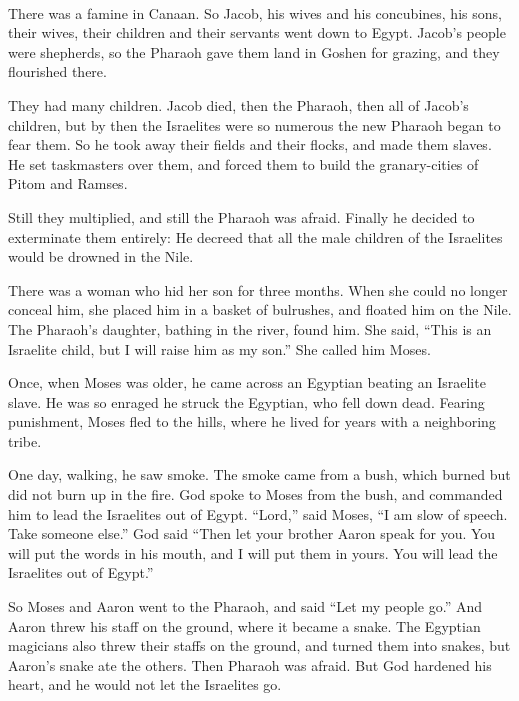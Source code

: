 \documentclass[a4paper,10pt,openany]{memoir}
\newenvironment{HgEnglish}{\strut\\\noindent}{\vspace{1em}}
\begin{document}
\begin{HgEnglish}
  \small
  There was a famine in Canaan.
  So Jacob,
  his wives and his concubines,
  his sons, their wives,
  their children and their servants went down to Egypt.
  Jacob's people were shepherds, 
  so the Pharaoh gave them land in Goshen for grazing, 
  and they flourished there.

  They had many children. 
  Jacob died, 
  then the Pharaoh, 
  then all of Jacob's children,
  but by then the Israelites were so numerous
  the new Pharaoh began to fear them.
  So he took away
  their fields and their flocks, 
  and made them slaves.
  He set taskmasters over them,
  and forced them to build the granary-cities of Pitom and Ramses.

  Still they multiplied, 
  and still the Pharaoh was afraid. 
  Finally he decided to exterminate them entirely: 
  He decreed that all the male children of the Israelites 
  would be drowned in the Nile.
  
  There was a woman who hid her son for three months. 
  When she could no longer conceal him,
  she placed him in a basket of bulrushes,
  and floated him on the Nile.
  The Pharaoh's daughter, bathing in the river, found him.
  She said,
  ``This is an Israelite child, 
  but I will raise him as my son.''
  She called him Moses.

  Once, when Moses was older, 
  he came across an Egyptian
  beating an Israelite slave. 
  He was so enraged he struck the Egyptian, who fell down dead.
  Fearing punishment, 
  Moses fled to the hills, 
  where he lived for years with a neighboring tribe.

  One day, walking, he saw smoke. 
  The smoke came from a bush, 
  which burned but did not burn up in the fire. 
  God spoke to Moses from the bush, 
  and commanded him to lead the Israelites out of Egypt. 
  ``Lord,'' said Moses,
  ``I am slow of speech. 
  Take someone else.'' 
  God said ``Then let your brother Aaron speak for you.
  You will put the words in his mouth, 
  and I will put them in yours.
  You will lead the Israelites out of Egypt.''

  So Moses and Aaron went to the Pharaoh, 
  and said ``Let my people go.'' 
  And Aaron threw his staff on the ground, where it became a snake.
  The Egyptian magicians also threw their staffs on the ground,
  and turned them into snakes,
  but Aaron's snake ate the others.
  Then Pharaoh was afraid. 
  But God hardened his heart,
  and he would not let the Israelites go.


\end{HgEnglish}
\end{document}

